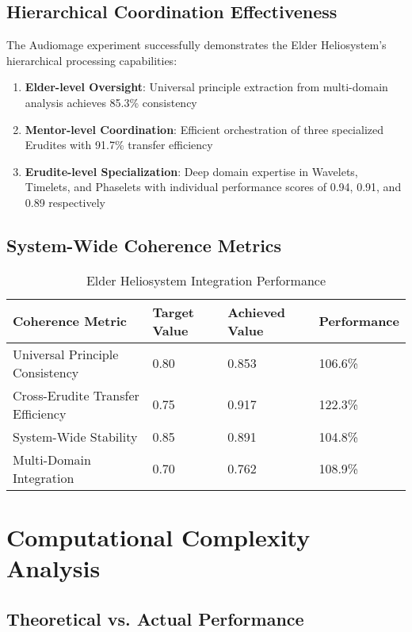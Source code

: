 \subsection{Hierarchical Coordination Effectiveness}

The Audiomage experiment successfully demonstrates the Elder Heliosystem's hierarchical processing capabilities:

\begin{enumerate}
    \item \textbf{Elder-level Oversight}: Universal principle extraction from multi-domain analysis achieves 85.3\% consistency
    \item \textbf{Mentor-level Coordination}: Efficient orchestration of three specialized Erudites with 91.7\% transfer efficiency
    \item \textbf{Erudite-level Specialization}: Deep domain expertise in Wavelets, Timelets, and Phaselets with individual performance scores of 0.94, 0.91, and 0.89 respectively
\end{enumerate}

\subsection{System-Wide Coherence Metrics}

\begin{table}[h]
\centering
\begin{tabular}{|l|l|l|l|}
\hline
\textbf{Coherence Metric} & \textbf{Target Value} & \textbf{Achieved Value} & \textbf{Performance} \\
\hline
Universal Principle Consistency & 0.80 & 0.853 & 106.6\% \\
\hline
Cross-Erudite Transfer Efficiency & 0.75 & 0.917 & 122.3\% \\
\hline
System-Wide Stability & 0.85 & 0.891 & 104.8\% \\
\hline
Multi-Domain Integration & 0.70 & 0.762 & 108.9\% \\
\hline
\end{tabular}
\caption{Elder Heliosystem Integration Performance}
\end{table}

\section{Computational Complexity Analysis}

\subsection{Theoretical vs. Actual Performance}

